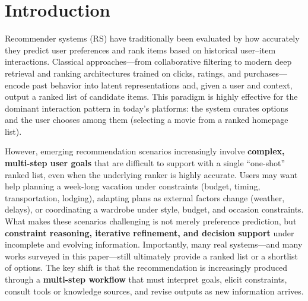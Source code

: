 \section{Introduction}
\label{sec:introduction}

Recommender systems (RS) have traditionally been evaluated by how accurately they predict user preferences and rank items based on historical user--item interactions.
Classical approaches---from collaborative filtering to modern deep retrieval and ranking architectures trained on clicks, ratings, and purchases---encode past behavior into latent representations and, given a user and context, output a ranked list of candidate items.
This paradigm is highly effective for the dominant interaction pattern in today’s platforms: the system curates options and the user chooses among them (\eg selecting a movie from a ranked homepage list).

However, emerging recommendation scenarios increasingly involve \textbf{complex, multi-step user goals} that are difficult to support with a single ``one-shot'' ranked list, even when the underlying ranker is highly accurate. 
Users may want help planning a week-long vacation under constraints (budget, timing, transportation, lodging), adapting plans as external factors change (weather, delays), or coordinating a wardrobe under style, budget, and occasion constraints.
What makes these scenarios challenging is not merely preference prediction, but \textbf{constraint reasoning, iterative refinement, and decision support} under incomplete and evolving information.
Importantly, many real systems---and many works surveyed in this paper---still ultimately provide a ranked list or a shortlist of options.
The key shift is that the recommendation is increasingly produced through a \textbf{multi-step workflow} that must interpret goals, elicit constraints, consult tools or knowledge sources, and revise outputs as new information arrives.




